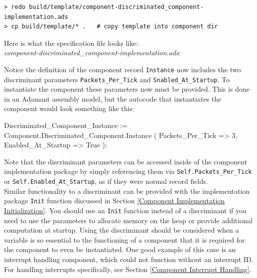 \vspace{5mm} %
\begin{verbatim}
> redo build/template/component-discriminated_component-implementation.ads
> cp build/template/* .   # copy template into component dir
\end{verbatim}
\vspace{5mm} %

Here is what the specification file looks like: \\

\textit{component-discriminated\_component-implementation.ads}:

Notice the definition of the component record \texttt{Instance} now includes the two discriminant parameters \texttt{Packets\_Per\_Tick} and \texttt{Snabled\_At\_Startup}. To instantiate the component these parameters now must be provided. This is done in an Adamant assembly model, but the autocode that instantiates the component would look something like this:

\vspace{5mm} %
\begin{adacode}
  Discriminated_Component_Instance := Component.Discriminated_Component.Instance (
    Packets_Per_Tick => 3,
    Enabled_At_Startup => True
  );
\end{adacode}
\vspace{5mm} %

Note that the discriminant parameters can be accessed inside of the component implementation package by simply referencing them via \texttt{Self.Packets\_Per\_Tick} or \texttt{Self.Enabled\_At\_Startup}, as if they were normal record fields. \\

Similar functionality to a discriminant can be provided with the implementation package \texttt{Init} function discussed in Section \ref{Component Implementation Initialization}. You should use an \texttt{Init} function instead of a discriminant if you need to use the parameters to allocate memory on the heap or provide additional computation at startup. Using the discriminant should be considered when a variable is so essential to the functioning of a component that it is required for the component to even be instantiated. One good example of this case is an interrupt handling component, which could not function without an interrupt ID. For handling interrupts specifically, see Section \ref{Component Interrupt Handling}.

